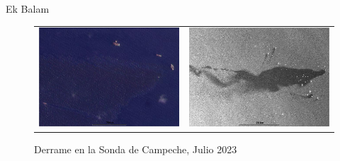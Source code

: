 \begin{frame}{Ek Balam}    
    \begin{figure}
        \centering
            \begin{tabular}[c]{cc}
              \includegraphics[scale=0.2]{img/section_01/ek_balam-6-julio.png}&
              \includegraphics[scale=0.2]{img/section_01/ek_balam-12-julio.png}\\
            \end{tabular}
        \caption{Derrame en la Sonda de Campeche, Julio 2023}
        \label{fig:section_01_explosion_ixtoc}
    \end{figure}
\end{frame}

